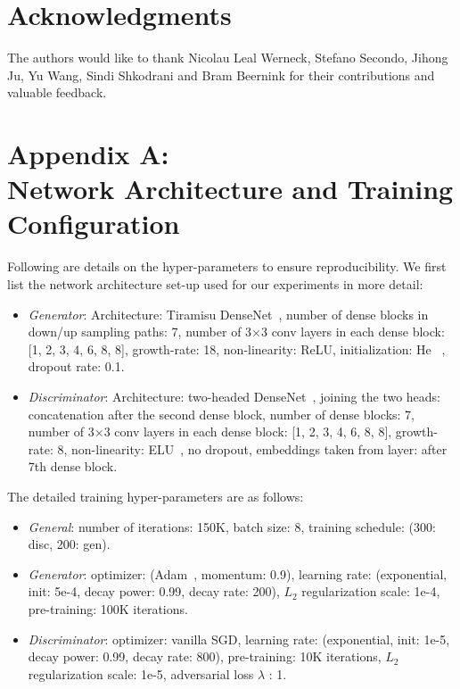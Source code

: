 \documentclass{article} \usepackage{nips13submit_e,times}
\begin{document}
\section*{Acknowledgments}

The authors would like to thank Nicolau Leal Werneck, Stefano Secondo, Jihong Ju, Yu Wang, Sindi Shkodrani and Bram Beernink for their contributions and valuable feedback.








\newpage
\appendix
\section*{Appendix A: \\ Network Architecture and Training Configuration}

Following are details on the hyper-parameters to ensure reproducibility.
We first list the network architecture set-up used for our experiments in more detail:

\begin{itemize}
  \item \emph{Generator}: Architecture: Tiramisu DenseNet~\cite{jegou2017the}, number of dense blocks in down/up sampling paths: 7, number of 3$\times$3 conv layers in each dense block: [1, 2, 3, 4, 6, 8, 8], growth-rate: 18, non-linearity: ReLU, initialization: He~\cite{he2015delving} , dropout rate: 0.1.
  \item \emph{Discriminator}: Architecture: two-headed DenseNet~\cite{huang2016densely}, joining the two heads: concatenation after the second dense block, number of dense blocks: 7, number of 3$\times$3 conv layers in each dense block: [1, 2, 3, 4, 6, 8, 8], growth-rate: 8, non-linearity: ELU~\cite{clevert2015fast}, no dropout, embeddings taken from layer: after 7th dense block.
\end{itemize}

\noindent
The detailed training hyper-parameters are as follows:

\begin{itemize}
    \item \emph{General}: number of iterations: 150K, batch size: 8, training schedule: (300: disc, 200: gen).
    \item \emph{Generator}: optimizer: (Adam~\cite{kingma2014adam}, momentum: 0.9), learning rate: (exponential, init: 5e-4, decay power: 0.99, decay rate: 200), $L_2$ regularization scale: 1e-4, pre-training: 100K iterations.
    \item \emph{Discriminator}: optimizer: vanilla SGD, learning rate: (exponential, init: 1e-5, decay power: 0.99, decay rate: 800), pre-training: 10K iterations, $L_2$ regularization scale: 1e-5, adversarial loss $\lambda$ : 1.
\end{itemize}
\end{document}
